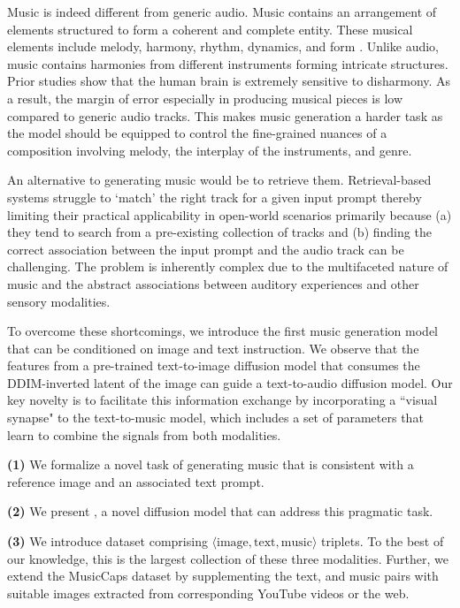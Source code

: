 Music is indeed different from generic audio. Music contains an arrangement of elements structured to form a coherent and complete entity. These musical elements include melody, harmony, rhythm, dynamics, and form \cite{schmidt2012basic, temperley2013statistical}. Unlike audio, music contains harmonies from different instruments forming intricate structures. Prior studies show \cite{habibi2014music, wu2013effects, zatorre2003music, norman2019divergence, das2020measurement, fedorenko2012sensitivity} that the human brain is extremely sensitive to disharmony. As a result, the margin of error especially in producing musical pieces is low compared to generic audio tracks. This makes music generation a harder task as the model should be equipped to control the fine-grained nuances of a composition involving melody, the interplay of the instruments, and genre.  

An alternative to generating music would be to retrieve them. Retrieval-based systems \cite{mulan, manco2022contrastive} struggle to `match' the right track for a given input prompt thereby limiting their practical applicability in open-world scenarios primarily because (a) they tend to search from a pre-existing collection of tracks and (b) finding the correct association between the input prompt and the audio track can be challenging. 
The problem is inherently complex due to the multifaceted nature of music and the abstract associations between auditory experiences and other sensory modalities. 

To overcome these shortcomings, we introduce the first music generation model that can be conditioned on image and text instruction. We observe that the features from a pre-trained text-to-image diffusion model that consumes the DDIM-inverted latent of the image can guide a text-to-audio diffusion model. Our key novelty is to facilitate this information exchange by incorporating a ``visual synapse" to the text-to-music model, which includes a set of parameters that learn to combine the signals from both modalities. 


\textbf{(1)} We formalize a novel task of generating music that is consistent with a reference image and an associated text prompt.

\textbf{(2)} We present \modelname, a novel diffusion model that can address this pragmatic task.  

\textbf{(3)} We introduce \ourdataset dataset comprising \ourdatasetsize $\langle \text{image}, \text{text}, \text{music} \rangle$ triplets. To the best of our knowledge, this is the largest collection of these three modalities. Further, we extend the MusicCaps \cite{musiclm} dataset by supplementing the text, and music pairs with suitable images extracted from corresponding YouTube videos or the web. 

